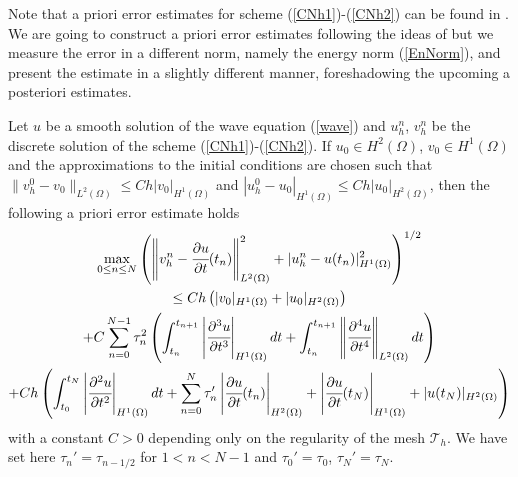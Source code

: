 \documentclass{imanum}
\begin{document}
Note that a priori error estimates for scheme (\ref{CNh1})-(\ref{CNh2})  can be found in \cite{Baker76, dupont19732, RT}. We are going to construct a priori error estimates following the ideas of \cite{Baker76} but we measure the error in a different norm, namely the energy norm (\ref{EnNorm}), and present the estimate in a slightly different manner, foreshadowing the upcoming a posteriori estimates.
\begin{theorem}\label{lemma}
  Let $u$ be a smooth solution of the wave equation (\ref{wave}) and $u_{h}^{n}$, $v_{h}^{n}$ be the discrete solution of the scheme (\ref{CNh1})-(\ref{CNh2}). If $u_0\in H^2(\Omega)$, $v_0\in H^1(\Omega)$ and the approximations to the initial conditions are chosen such that
  $\| v^0_h - v_0 \|_{L^2(\Omega)}  \le Ch| v_0 |_{H^1(\Omega)} $ and
  $| u^0_h - u_0 |_{H^1(\Omega)}  \le Ch | u_0 |_{H^2(\Omega)}$, then the following a priori error estimate holds
  \begin{multline}
\label{apriori}    
\max_{0\le n \le N}\left( \left\Vert v^n_h - \cfrac{\partial u}{\partial t} (t_n)\right\Vert_{L^2(\Omega)}^2 + | u^n_h - u (t_n) |^2_{H^1(\Omega)}\right)^{1/2} \\
\leq 
    Ch\left(| v_0 |_{H^1(\Omega)} + | u_0 |_{H^2(\Omega)}\right)
    \\
    + C\sum_{n = 0}^{N - 1} \tau^2_n \left(
    \int_{t_n}^{t_{n + 1}} \left\vert \cfrac{\partial^3 u }{\partial t^3} \right\vert_{H^1(\Omega)} {dt} +
    \int_{t_n}^{t_{n + 1}} \left\Vert \cfrac{\partial^4 u }{\partial t^4} \right\Vert_{L^2(\Omega)} {dt} \right)
    \\
    + C h  \left( \int_{t_0}^{t_N} \left\vert \cfrac{\partial^2 u }{\partial t^2} \right\vert_{H^1(\Omega)} {dt}
        + \sum_{n=0}^{N}  \tau_n'\left\vert \cfrac{\partial u}{\partial t} (t_n)\right\vert_{H^2(\Omega)} 
    + \left\vert \cfrac{\partial u }{\partial t}(t_N) \right\vert_{H^1(\Omega)} + | u ( t_N) |_{H^2(\Omega)}
    \right) 
  \end{multline}
 with a constant $C>0$ depending only on the regularity of the mesh $\mathcal{T}_h$. We have set here $\tau_n'=\tau_{n-1/2}$ for $1<n<N-1$ and $\tau_0'=\tau_0$, $\tau_N'=\tau_N$.
\end{theorem}
\end{document}
